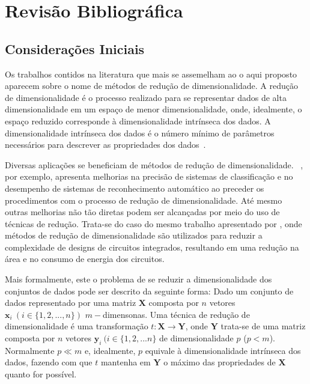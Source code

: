 \chapter{Revisão Bibliográfica}\label{chap:revisao}

\section{Considerações Iniciais}


Os trabalhos contidos na literatura que mais se assemelham ao o aqui proposto aparecem sobre o nome de métodos de redução de dimensionalidade. 
A redução de dimensionalidade é o processo realizado para se representar dados de alta dimensionalidade em um espaço de menor dimensionalidade, onde, idealmente, o espaço reduzido corresponde à dimensionalidade intrínseca dos dados. 
A dimensionalidade intrínseca dos dados é o número mínimo de parâmetros necessários para descrever as propriedades dos dados~\cite{Fukunaga1990}.

Diversas aplicações se beneficiam de métodos de redução de dimensionalidade. 
\citeauthor{Konig2000}~\cite{Konig2000}, por exemplo, apresenta melhorias na precisão de sistemas de classificação e no desempenho de sistemas de reconhecimento automático ao preceder os procedimentos com o processo de redução de dimensionalidade. 
Até mesmo outras melhorias não tão diretas podem ser alcançadas por meio do uso de técnicas de redução. 
Trata-se do caso do mesmo trabalho apresentado por \citeauthor{Konig2000}, onde métodos de redução de dimensionalidade são utilizados para reduzir a complexidade de designs de circuitos integrados, resultando em uma redução na área e no consumo de energia dos circuitos.

Mais formalmente, este o problema de se reduzir a dimensionalidade dos conjuntos de dados pode ser descrito da seguinte forma: 
Dado um conjunto de dados representado por uma matriz $\textbf{X}$ composta por $n$ vetores $\textbf{x}_i~(i \in \{1,2,...,n\})$ $m-$dimensonas. 
Uma técnica de redução de dimensionalidade é uma transformação $t: \textbf{X} \rightarrow \textbf{Y}$, onde $\textbf{Y}$ trata-se de uma matriz composta por $n$ vetores $\textbf{y}_i~(i \in \{1,2,...n\}$ de dimensionalidade $p$ ($p < m$). 
Normalmente $p \ll m$ e, idealmente, $p$ equivale à dimensionalidade intrínseca dos dados, fazendo com que $t$ mantenha em $\textbf{Y}$ o máximo das propriedades de $\textbf{X}$ quanto for possível. 

